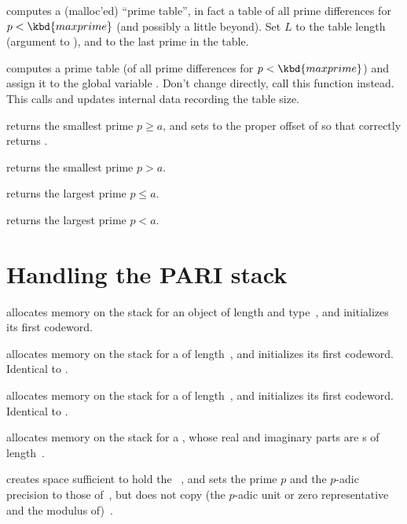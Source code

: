computes a (malloc'ed) ``prime table'', in fact a table of all prime
differences for $p < \kbd{maxprime}$ (and possibly a little beyond). Set $L$
to the table length (argument to ), and  to the last
prime in the table.

 computes a prime table (of all prime
differences for $p < \kbd{maxprime}$) and assign it to the global variable
. Don't change  directly, call this function
instead. This calls  and updates internal data recording the
table size.

returns the smallest prime $p \geq a$, and sets  to the proper offset
of  so that  correctly
returns .

 returns the smallest
prime $p > a$.

 returns the largest
prime $p \leq a$.

 returns the largest
prime $p < a$.

\section{Handling the PARI stack}


 allocates memory on the stack for
an object of length  and type~, and initializes its first
codeword.

 allocates memory on the stack for a 
of length~, and initializes its first codeword. Identical to
.

 allocates memory on the stack for a 
of length~, and initializes its first codeword. Identical to
.

 allocates memory on the stack for a
, whose real and imaginary parts are s
of length~.

 creates space sufficient to hold the
~, and sets the prime $p$ and the $p$-adic precision to
those of~, but does not copy (the $p$-adic unit or zero representative
and the modulus of)~.

